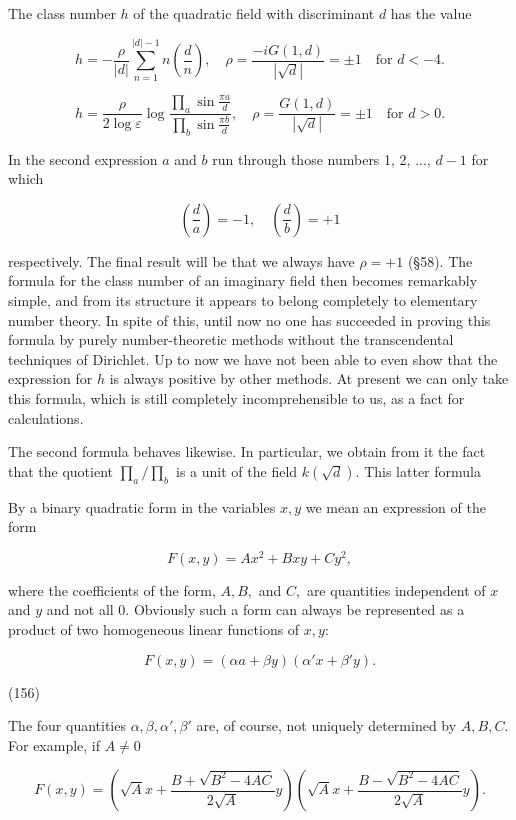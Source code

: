 The class number $h$ of the quadratic field with discriminant $d$ has the value

$$h = -\frac{\rho}{|d|} \sum_{n=1}^{|d|-1} n \left( \frac{d}{n} \right), \quad \rho = \frac{-iG(1, d)}{|\sqrt{d}|} = \pm 1 \quad \text{for } d < -4.$$

$$h = \frac{\rho}{2 \log \varepsilon} \log \frac{\prod_a \sin \frac{\pi a}{d}}{\prod_b \sin \frac{\pi b}{d}}, \quad \rho = \frac{G(1, d)}{|\sqrt{d}|} = \pm 1 \quad \text{for } d > 0.$$

In the second expression $a$ and $b$ run through those numbers 1, 2, ..., $d-1$ for which

$$\left( \frac{d}{a} \right) = -1, \quad \left( \frac{d}{b} \right) = +1$$

respectively. The final result will be that we always have $\rho = +1$ (§58). The formula for the class number of an imaginary field then becomes remarkably simple, and from its structure it appears to belong completely to elementary number theory. In spite of this, until now no one has succeeded in proving this formula by purely number-theoretic methods without the transcendental techniques of Dirichlet. Up to now we have not been able to even show that the expression for $h$ is always positive by other methods. At present we can only take this formula, which is still completely incomprehensible to us, as a fact for calculations.

The second formula behaves likewise. In particular, we obtain from it the fact that the quotient $\prod_a / \prod_b$ is a unit of the field $k(\sqrt{d})$. This latter formula

By a binary quadratic form in the variables $x, y$ we mean an expression of the form

$$F(x, y) = Ax^2 + Bxy + Cy^2,$$

where the coefficients of the form, $A, B,$ and $C,$ are quantities independent of $x$ and $y$ and not all 0. Obviously such a form can always be represented as a product of two homogeneous linear functions of $x, y$:

$$F(x, y) = (\alpha a + \beta y)(\alpha' x + \beta' y).$$

(156)

The four quantities $\alpha, \beta, \alpha', \beta'$ are, of course, not uniquely determined by $A, B, C$. For example, if $A \neq 0$

$$F(x, y) = \left( \sqrt{A}x + \frac{B + \sqrt{B^2 - 4AC}}{2\sqrt{A}}y \right) \left( \sqrt{A}x + \frac{B - \sqrt{B^2 - 4AC}}{2\sqrt{A}}y \right).$$


